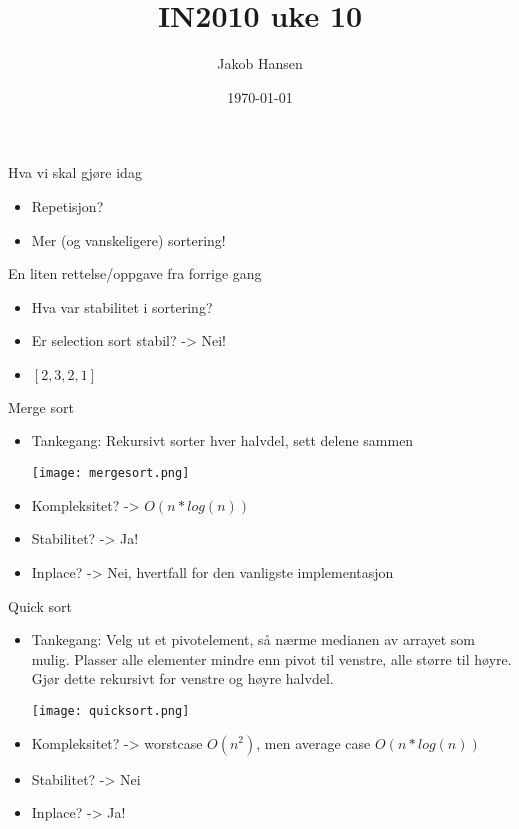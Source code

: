 \documentclass[norsk, handout]{beamer}
\title{IN2010 uke 10}
\author{Jakob Hansen}
\date{\today}
\begin{document}
	\frame{\titlepage}
    \begin{frame}{Hva vi skal gjøre idag}
        \begin{itemize}
            \item Repetisjon?
            \item Mer (og vanskeligere) sortering!
        \end{itemize}
    \end{frame}

    \begin{frame}{En liten rettelse/oppgave fra forrige gang}
        \begin{itemize}
            \item Hva var stabilitet i sortering?
            \pause
            \item Er selection sort stabil? \pause -> Nei!
            \item $[2,3,2,1]$
        \end{itemize}
    \end{frame}

    \begin{frame}{Merge sort}
        \begin{itemize}
            \item Tankegang: Rekursivt sorter hver halvdel, sett delene sammen
                \pause
                \begin{center}
                    \texttt{[image: mergesort.png]} 
                \end{center}
            \item Kompleksitet? \pause -> $O(n*log(n))$
            \item Stabilitet? \pause -> Ja!
            \item Inplace? \pause -> Nei, hvertfall for den vanligste implementasjon
        \end{itemize}
    \end{frame}

    \begin{frame}{Quick sort}
        \begin{itemize}
            \item Tankegang: Velg ut et pivotelement, så nærme medianen av arrayet som mulig.
                Plasser alle elementer mindre enn pivot til venstre, alle større til høyre.
                Gjør dette rekursivt for venstre og høyre halvdel.
                \pause
                \begin{center}
                    \texttt{[image: quicksort.png]} 
                \end{center}
            \item Kompleksitet? \pause -> worstcase $O(n^2)$, men average case $O(n*log(n))$
            \item Stabilitet? \pause -> Nei
            \item Inplace? \pause -> Ja!
        \end{itemize}
    \end{frame}
\end{document}
